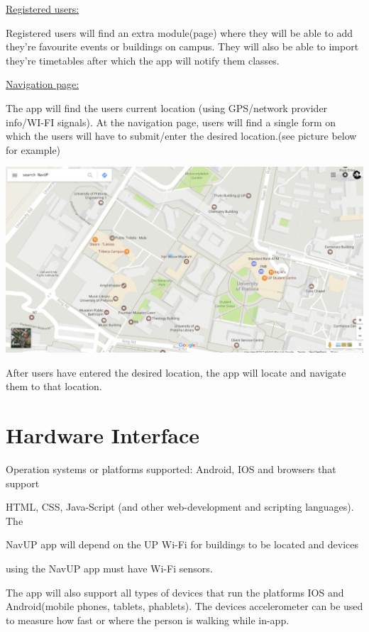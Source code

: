 \documentclass[11pt]{article}
\begin{document}
{\raggedright



}



{\raggedleft

\uline{Registered users:}}



{\raggedright

Registered users will find an extra module(page) where they will be able to add they're favourite events or buildings on campus. They will also be able to import they're timetables after which the app will notify them classes.

}



{\raggedright

\uline{Navigation page:}}



The app will find the users current location (using GPS/network provider info/WI-FI signals). At the navigation page, users will find a single form on which the users will have to submit/enter the desired location.(see picture below for example)



\includegraphics{1.png}



After users have entered the desired location, the app will locate and navigate them to that location. 







\section{Hardware Interface}

{\raggedright

Operation systems or platforms supported: Android, IOS and browsers that support

HTML, CSS, Java-Script (and other web-development and scripting languages). The

NavUP app will depend on the UP Wi-Fi for buildings to be located and devices

using the NavUP app must have Wi-Fi sensors.

The app will also support all types of devices that run the platforms IOS and Android(mobile phones, tablets, phablets). The devices accelerometer can be used to measure how fast or where the person is walking while in-app.

}
\end{document}
